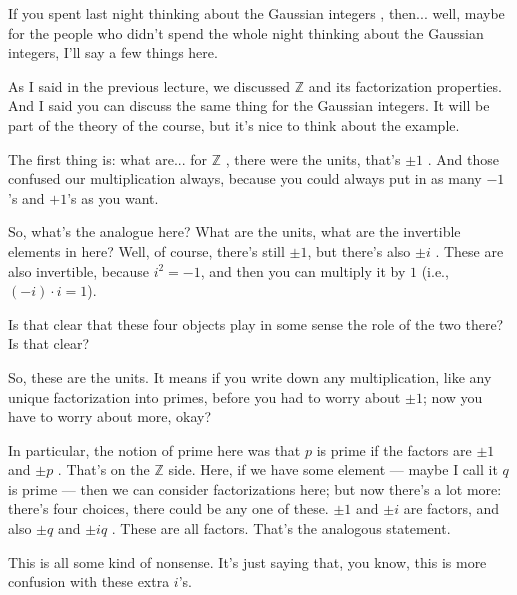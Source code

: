 \begin{speech}[00:00:53 - 00:02:48]
If you spent last night thinking about the Gaussian integers , then... well, maybe for the people who didn't spend the whole night thinking about the Gaussian integers, I'll say a few things here.

As I said in the previous lecture, we discussed $\mathbb{Z}$ and its factorization properties. And I said you can discuss the same thing for the Gaussian integers. It will be part of the theory of the course, but it's nice to think about the example.

The first thing is: what are... for $\mathbb{Z}$ , there were the units, that's $\pm 1$ . And those confused our multiplication always, because you could always put in as many $-1$'s and $+1$'s as you want.

So, what's the analogue here? What are the units, what are the invertible elements in here? Well, of course, there's still $\pm 1$, but there's also $\pm i$ . These are also invertible, because $i^2 = -1$, and then you can multiply it by $1$ (i.e., $(-i) \cdot i = 1$).

Is that clear that these four objects play in some sense the role of the two there? Is that clear?

So, these are the units. It means if you write down any multiplication, like any unique factorization into primes, before you had to worry about $\pm 1$; now you have to worry about more, okay?

In particular, the notion of prime here was that $p$ is prime  if the factors are $\pm 1$ and $\pm p$ . That's on the $\mathbb{Z}$ side. Here, if we have some element --- maybe I call it $q$ is prime  --- then we can consider factorizations here; but now there's a lot more: there's four choices, there could be any one of these. $\pm 1$ and $\pm i$ are factors, and also $\pm q$ and $\pm i q$ . These are all factors. That's the analogous statement.

This is all some kind of nonsense. It's just saying that, you know, this is more confusion with these extra $i$'s.
\end{speech}

